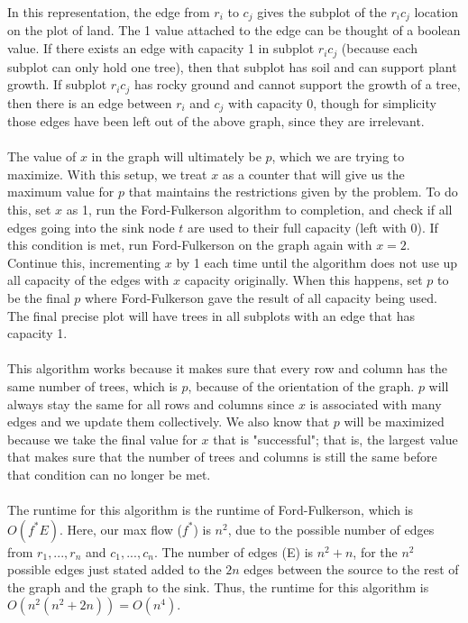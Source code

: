 \documentclass[11pt]{article}
\begin{document}
\begin{enumerate}
In this representation, the edge from $r_i$ to $c_j$ gives the subplot of the $r_i c_j$ location on the plot of land. The 1 value attached to the edge can be thought of a boolean value. If there exists an edge with capacity 1 in subplot $r_i c_j$ (because each subplot can only hold one tree), then that subplot has soil and can support plant growth. If subplot $r_i c_j$ has rocky ground and cannot support the growth of a tree, then there is an edge between $r_i$ and $c_j$ with capacity 0, though for simplicity those edges have been left out of the above graph, since they are irrelevant. \\
\\
The value of $x$ in the graph will ultimately be $p$, which we are trying to maximize. With this setup, we treat $x$ as a counter that will give us the maximum value for $p$ that maintains the restrictions given by the problem. To do this, set $x$ as 1, run the Ford-Fulkerson algorithm to completion, and check if all edges going into the sink node $t$ are used to their full capacity (left with 0). If this condition is met, run Ford-Fulkerson on the graph again with $x = 2$. Continue this, incrementing $x$ by 1 each time until the algorithm does not use up all capacity of the edges with $x$ capacity originally. When this happens, set $p$ to be the final $p$ where Ford-Fulkerson gave the result of all capacity being used. The final precise plot will have trees in all subplots with an edge that has capacity 1. \\
\\
This algorithm works because it makes sure that every row and column has the same number of trees, which is $p$, because of the orientation of the graph. $p$ will always stay the same for all rows and columns since $x$ is associated with many edges and we update them collectively. We also know that $p$ will be maximized because we take the final value for $x$ that is "successful"; that is, the largest value that makes sure that the number of trees and columns is still the same before that condition can no longer be met. \\
\\
The runtime for this algorithm is the runtime of Ford-Fulkerson, which is $O(f^*E)$. Here, our max flow ($f^*$) is $n^2$, due to the possible number of edges from $r_1, ..., r_n$ and $c_1, ..., c_n$. The number of edges (E) is $n^2 + n$, for the $n^2$ possible edges just stated added to the $2n$ edges between the source to the rest of the graph and the graph to the sink. Thus, the runtime for this algorithm is $O(n^2(n^2 + 2n)) = O(n^4)$. 


\end{enumerate}
\end{document}
